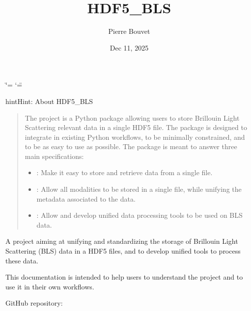 \documentclass[letterpaper,10pt,english]{sphinxmanual}
\title{HDF5\_BLS}
\date{Dec 11, 2025}
\author{Pierre Bouvet}
\begin{document}
\ifdefined\shorthandoff
  \ifnum\catcode`\=\string=\active\shorthandoff{=}\fi
  \ifnum\catcode`\"=\active{}\fi
\fi

\pagestyle{empty}
\sphinxmaketitle
\pagestyle{plain}
\sphinxtableofcontents
\pagestyle{normal}
\label{\detokenize{index::doc}}
\begin{figure}[htbp]
\centering

\noindent{}
\end{figure}



\begin{sphinxadmonition}{hint}{Hint:}
\sphinxAtStartPar
About HDF5\_BLS
\begin{quote}

\sphinxAtStartPar
The  project is a Python package allowing users to store Brillouin Light Scattering relevant data in a single HDF5 file. The package is designed to integrate in existing Python workflows, to be minimally constrained, and to be as easy to use as possible. The package is meant to answer three main specifications:
\begin{itemize}
\item {} 
\sphinxAtStartPar
{}: Make it easy to store and retrieve data from a single file.

\item {} 
\sphinxAtStartPar
{}: Allow all modalities to be stored in a single file, while unifying the metadata associated to the data.

\item {} 
\sphinxAtStartPar
{}: Allow and develop unified data processing tools to be used on BLS data.

\end{itemize}
\end{quote}

\sphinxAtStartPar
A project aiming at unifying and standardizing the storage of Brillouin Light Scattering (BLS) data in a HDF5 files, and to develop unified tools to process these data.
\end{sphinxadmonition}

\sphinxAtStartPar
This documentation is intended to help users to understand the project and to use it in their own workflows.

\sphinxAtStartPar
GitHub repository: 
\end{document}
